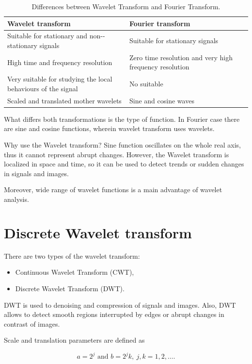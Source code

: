 \begin{table}[h]
\centering
\begin{tabular}{|p{0.5\linewidth}|p{0.5\linewidth}|}
\toprule
\textbf{ Wavelet transform} & \textbf{Fourier transform}
\\ \midrule
Suitable for stationary and non-\allowbreak -stationary signals 
& Suitable for stationary signals 
\\ \midrule
High time and frequency resolution
& Zero time resolution and very high frequency resolution     
\\ \midrule
Very suitable for studying the local behaviours of the signal
& No suitable  
\\ \midrule
Scaled and translated mother wavelets
& Sine and cosine waves
\\ \bottomrule
\end{tabular}
\caption{Differences between Wavelet Transform and Fourier Transform.}
\end{table}

What differs both transformations is the type of function. In Fourier case there are sine and cosine functions, wherein wavelet transform uses wavelets.

Why use the Wavelet transform?
Sine function oscillates on the whole real axis, thus it cannot represent abrupt changes. However, the Wavelet transform is localized in space and time, so it can be used to detect trends or sudden changes in signals and images. 

Moreover, wide range of wavelet functions is a main advantage of wavelet analysis.

\section{Discrete Wavelet transform}
There are two types of the wavelet transform:
\begin{itemize}
\item Continuous Wavelet Transform (CWT),
\item Discrete Wavelet Transform (DWT).
\end{itemize}

DWT is used to denoising and compression of signals and images. Also, DWT allows to detect smooth regions interrupted by edges or abrupt changes in contrast of images.

Scale and translation parameters are defined as

\begin{equation}
a = 2^j \text{ and } b = 2^j k,\ j,k=1,2,\ldots.
\end{equation}

